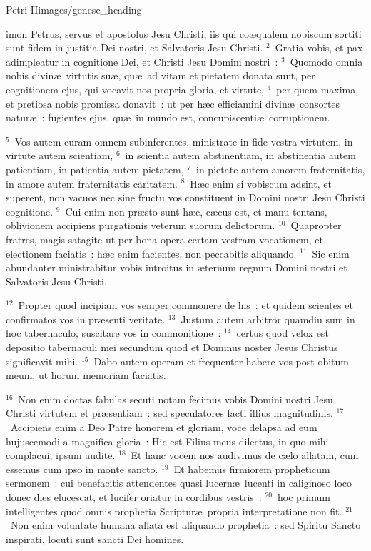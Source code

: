 {Petri II}{images/genese_heading}


\bchapter
{}imon Petrus, servus et apostolus Jesu Christi, iis qui co\ae qualem nobiscum sortiti sunt fidem in justitia Dei nostri, et Salvatoris Jesu Christi.
${}^{2}$~Gratia vobis, et pax adimpleatur in cognitione Dei, et Christi Jesu Domini nostri~:
${}^{3}$~Quomodo omnia nobis divin\ae\ virtutis su\ae , qu\ae\ ad vitam et pietatem donata sunt, per cognitionem ejus, qui vocavit nos propria gloria, et virtute,
${}^{4}$~per quem maxima, et pretiosa nobis promissa donavit~: ut per h\ae c efficiamini divin\ae\ consortes natur\ae~: fugientes ejus, qu\ae\ in mundo est, concupiscenti\ae\ corruptionem.


${}^{5}$~Vos autem curam omnem subinferentes, ministrate in fide vestra virtutem, in virtute autem scientiam,
${}^{6}$~in scientia autem abstinentiam, in abstinentia autem patientiam, in patientia autem pietatem,
${}^{7}$~in pietate autem amorem fraternitatis, in amore autem fraternitatis caritatem.
${}^{8}$~H\ae c enim si vobiscum adsint, et superent, non vacuos nec sine fructu vos constituent in Domini nostri Jesu Christi cognitione.
${}^{9}$~Cui enim non pr\ae sto sunt h\ae c, c\ae cus est, et manu tentans, oblivionem accipiens purgationis veterum suorum delictorum.
${}^{10}$~Quapropter fratres, magis satagite ut per bona opera certam vestram vocationem, et electionem faciatis~: h\ae c enim facientes, non peccabitis aliquando.
${}^{11}$~Sic enim abundanter ministrabitur vobis introitus in \ae ternum regnum Domini nostri et Salvatoris Jesu Christi.


${}^{12}$~Propter quod incipiam vos semper commonere de his~: et quidem scientes et confirmatos vos in pr\ae senti veritate.
${}^{13}$~Justum autem arbitror quamdiu sum in hoc tabernaculo, suscitare vos in commonitione~:
${}^{14}$~certus quod velox est depositio tabernaculi mei secundum quod et Dominus noster Jesus Christus significavit mihi.
${}^{15}$~Dabo autem operam et frequenter habere vos post obitum meum, ut horum memoriam faciatis.


${}^{16}$~Non enim doctas fabulas secuti notam fecimus vobis Domini nostri Jesu Christi virtutem et pr\ae sentiam~: sed speculatores facti illius magnitudinis.
${}^{17}$~Accipiens enim a Deo Patre honorem et gloriam, voce delapsa ad eum hujuscemodi a magnifica gloria~: Hic est Filius meus dilectus, in quo mihi complacui, ipsum audite.
${}^{18}$~Et hanc vocem nos audivimus de c\ae lo allatam, cum essemus cum ipso in monte sancto.
${}^{19}$~Et habemus firmiorem propheticum sermonem~: cui benefacitis attendentes quasi lucern\ae\ lucenti in caliginoso loco donec dies elucescat, et lucifer oriatur in cordibus vestris~:
${}^{20}$~hoc primum intelligentes quod omnis prophetia Scriptur\ae\ propria interpretatione non fit.
${}^{21}$~Non enim voluntate humana allata est aliquando prophetia~: sed Spiritu Sancto inspirati, locuti sunt sancti Dei homines.

